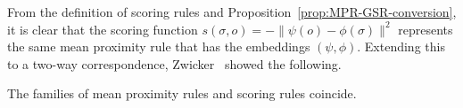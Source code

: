\documentclass[prodmode,acmec]{ec-acmsmall}
\newcommand{\calL}{{\mathcal{L}}}
\newcommand{\rank}{{\calL(A)}}
\newcommand{\calO}{{\mathcal{O}}}
\begin{document}
From the definition of scoring rules and Proposition~\ref{prop:MPR-GSR-conversion}, it is clear that the scoring function $s(\sigma,o) = -\|\psi(o)-\phi(\sigma)\|^2$ represents the same mean proximity rule that has the embeddings $(\psi,\phi)$. Extending this to a two-way correspondence, Zwicker~ showed the following. 
\begin{proposition}
The families of mean proximity rules and scoring rules coincide. 
\label{prop:equiv}
\end{proposition}
%

\end{document}
